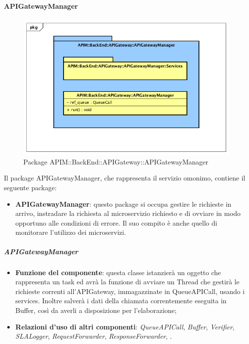 \paragraph{APIGatewayManager}
\begin{figure}[!htbp]
	\centering
	\includegraphics[scale=0.45]{UML/DiagrammiPackage/APIGatewayManager.png}
	\caption{Package APIM::BackEnd::APIGateway::APIGatewayManager}
\end{figure}

Il package APIGatewayManager, che rappresenta il servizio omonimo, contiene il seguente package:
\begin{itemize}
	\item \textbf{APIGatewayManager}: questo package si occupa gestire le richieste in arrivo, instradare la richiesta al microservizio richiesto e di ovviare in modo opportuno alle condizioni di errore. Il suo compito \`{e} anche quello di monitorare  l'utilizzo dei microservizi.
\end{itemize}

\subparagraph{APIGatewayManager}
\begin{itemize}
	\item \textbf{Funzione del componente}: questa classe istanzier\`{a} un oggetto che rappresenta un task ed avr\`{a} la funzione di avviare un Thread che gestir\`{a} le richieste correnti all'APIGateway, immagazzinate in QueueAPICall, usando i services. Inoltre salverà i dati della chiamata correntemente eseguita in Buffer, così da averli a disposizione per l'elaborazione;
	\item \textbf{Relazioni d'uso di altri componenti}: \textit{QueueAPICall}, \textit{Buffer}, \textit{Verifier}, \textit{SLALogger}, \textit{RequestForwarder}, \textit{ResponseForwarder}, .
\end{itemize}

